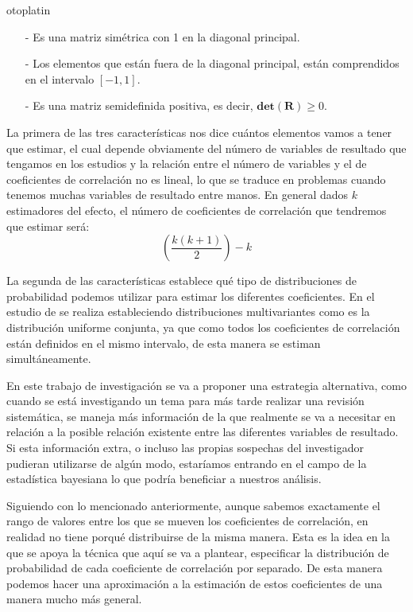 otoplatin\documentclass[a4paper,openright,12pt]{report}
\begin{document}
\begin{itemize}
\item[-] Es una matriz simétrica con 1 en la diagonal principal.
\item[-] Los elementos que están fuera de la diagonal principal, están comprendidos en el intervalo $[-1,1]$.
\item[-] Es una matriz semidefinida positiva, es decir, $\mathbf{det}(\mathbf{R})\geq 0$. 
\end{itemize}

La primera de las tres características nos dice cuántos elementos vamos a tener que estimar, el cual depende obviamente del número de variables de resultado que tengamos en los estudios y la relación entre el número de variables y el de coeficientes de correlación no es lineal, lo que se traduce en problemas cuando tenemos muchas variables de resultado entre manos.
En general dados $k$ estimadores del efecto, el número de coeficientes de correlación que tendremos que estimar será: $$(\dfrac{k(k+1)}{2})-k$$

La segunda de las características establece qué tipo de distribuciones de probabilidad podemos utilizar para estimar los diferentes coeficientes. En el estudio de \cite{Barnard2000} se realiza estableciendo distribuciones multivariantes como es la distribución uniforme conjunta, ya que como todos los coeficientes de correlación están definidos en el mismo intervalo, de esta manera se estiman simultáneamente. 

En este trabajo de investigación se va a proponer una estrategia alternativa, como cuando se está investigando un tema para más tarde realizar una revisión sistemática, se maneja más información de la que realmente se va a necesitar en relación a la posible relación existente entre las diferentes variables de resultado. Si esta información extra, o incluso las propias sospechas del investigador pudieran utilizarse de algún modo, estaríamos entrando en el campo de la estadística bayesiana lo que podría beneficiar a nuestros análisis.

Siguiendo con lo mencionado anteriormente, aunque sabemos exactamente el rango de valores entre los que se mueven los coeficientes de correlación, en realidad no tiene porqué distribuirse de la misma manera. Esta es la idea en la que se apoya la técnica que aquí se va a plantear, especificar la distribución de probabilidad de cada coeficiente de correlación por separado. De esta manera podemos hacer una aproximación a la estimación de estos coeficientes de una manera mucho más general.
\end{document}
